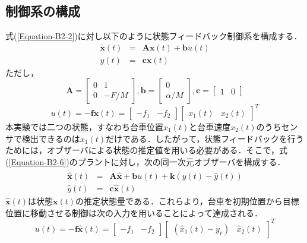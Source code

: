 \documentclass[12pt]{jsarticle}
\begin{document}
\subsection{制御系の構成}
式(\ref{Equation-B2-2})に対し以下のように状態フィードバック制御系を構成する．
\begin{eqnarray}
  \label{Equation-B2-5}
  \dot{\bm x}(t) &=& {\bm A}{\bm x}(t) + {\bm b}u(t) \\
  \label{Equation-B2-6}
  y(t) &=& {\bm c}{\bm x}(t)
\end{eqnarray}
ただし，
\begin{equation}
  \label{Equation-B2-7}
  {\bm A} = \left[\begin{array}{cc}0&1\\ 0&-F/M\end{array}\right], {\bm b} = \left[\begin{array}{c}0\\ \alpha/M\end{array}\right], {\bm c} = [\begin{array}{cc}1&0\end{array}]
\end{equation}
\begin{equation}
  \label{Equation-B2-8}
  u(t) = -{\bm f}{\bm x}(t) = [\begin{array}{cc}-f_1&-f_2\end{array}][\begin{array}{cc}x_1(t)&x_2(t)\end{array}]^T
\end{equation}
本実験では二つの状態，すなわち台車位置$x_1(t)$と台車速度$x_2(t)$のうちセンサで検出できるのは$x_1(t)$だけである．したがって，状態フィードバックを行うためには，オブザーバによる状態の推定値を用いる必要がある．そこで，式(\ref{Equation-B2-6})のプラントに対し，次の同一次元オブザーバを構成する．
\begin{eqnarray}
  \label{Equation-B2-9}
  \dot{\hat{\bm x}}(t) &=& {\bm A} \hat{\bm x} + {\bm b}u(t) + {\bm k}(y(t) - \hat{y}(t)) \\
  \label{Equation-B2-10}
  \hat{y}(t) &=& {\bm c}\hat{\bm x}(t)
\end{eqnarray}
$\hat{\bm x}(t)$は状態${\bm x}(t)$の推定状態量である．これらより，台車を初期位置から目標位置に移動させる制御は次の入力を用いることによって達成される．
\begin{equation}
  \label{Equation-B2-11}
  u(t) = -{\bm f} \hat{\bm x}(t) = \left[\begin{array}{cc}-f_1&-f_2\end{array}\right]\left[\begin{array}{cc}(\hat{x}_1(t)-y_r)&\hat{x}_2(t)\end{array}\right]^T
\end{equation}
\end{document}
